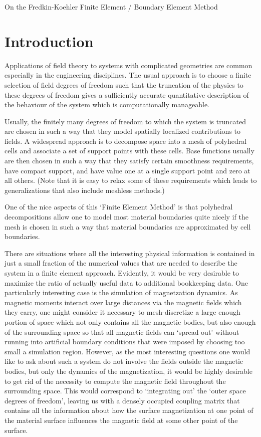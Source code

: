 \documentclass{article}
\begin{document}
{\large On the Fredkin-Koehler Finite Element / Boundary Element Method}

\section{Introduction}

Applications of field theory to systems with complicated geometries
are common especially in the engineering disciplines. The usual
approach is to choose a finite selection of field degrees of freedom
such that the truncation of the physics to these degrees of freedom
gives a sufficiently accurate quantitative description of the
behaviour of the system which is computationally manageable.

Usually, the finitely many degrees of freedom to which the system is
truncated are chosen in such a way that they model spatially localized
contributions to fields. A widespread approach is to decompose space
into a mesh of polyhedral cells and associate a set of support points
with these cells. Base functions usually are then chosen in such a way
that they satisfy certain smoothness requirements, have compact
support, and have value one at a single support point and zero at all
others. (Note that it is easy to relax some of these requirements
which leads to generalizations that also include meshless methods.)

One of the nice aspects of this `Finite Element Method' is that
polyhedral decompositions allow one to model most material boundaries
quite nicely if the mesh is chosen in such a way that material
boundaries are approximated by cell boundaries.

There are situations where all the interesting physical information is
contained in just a small fraction of the numerical values that are
needed to describe the system in a finite element approach. Evidently,
it would be very desirable to maximize the ratio of actually useful
data to additional bookkeeping data. One particularly interesting case
is the simulation of magnetzation dynamics. As magnetic moments
interact over large distances via the magnetic fields which they
carry, one might consider it necessary to mesh-discretize a large
enough portion of space which not only contains all the magnetic
bodies, but also enough of the surrounding space so that all magnetic
fields can `spread out' without running into artificial boundary
conditions that were imposed by choosing too small a simulation
region. However, as the most interesting questions one would like to
ask about such a system do not involve the fields outside the magnetic
bodies, but only the dynamics of the magnetization, it would be highly
desirable to get rid of the necessity to compute the magnetic field
throughout the surrounding space. This would correspond to
`integrating out' the `outer space degrees of freedom', leaving us
with a densely occupied coupling matrix that contains all the
information about how the surface magnetization at one point of the
material surface influences the magnetic field at some other point of
the surface.
\end{document}
